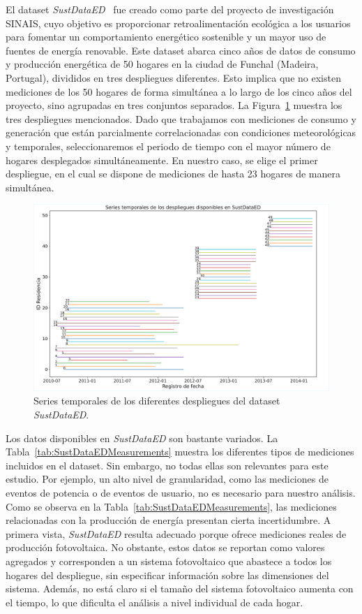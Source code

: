 El dataset \textit{SustDataED}~\cite{sustdata} fue creado como parte del proyecto de investigación SINAIS, cuyo objetivo es proporcionar retroalimentación ecológica a los usuarios para fomentar un comportamiento energético sostenible y un mayor uso de fuentes de energía renovable. Este dataset abarca cinco años de datos de consumo y producción energética de 50 hogares en la ciudad de Funchal (Madeira, Portugal), divididos en tres despliegues diferentes. Esto implica que no existen mediciones de los 50 hogares de forma simultánea a lo largo de los cinco años del proyecto, sino agrupadas en tres conjuntos separados. La Figura~\ref{fig:demographics} muestra los tres despliegues mencionados. Dado que trabajamos con mediciones de consumo y generación que están parcialmente correlacionadas con condiciones meteorológicas y temporales, seleccionaremos el periodo de tiempo con el mayor número de hogares desplegados simultáneamente. En nuestro caso, se elige el primer despliegue, en el cual se dispone de mediciones de hasta 23 hogares de manera simultánea.
 

\begin{figure}[ht!]
    \centering
    \includegraphics[width=\textwidth]{fig/06_fault_sg/fault_sg_01.pdf}
    \caption{Series temporales de los diferentes despliegues del dataset \textit{SustDataED}.}
    \label{fig:demographics}
\end{figure}

Los datos disponibles en \textit{SustDataED} son bastante variados. La Tabla~\ref{tab:SustDataEDMeasurements} muestra los diferentes tipos de mediciones incluidos en el dataset. Sin embargo, no todas ellas son relevantes para este estudio. Por ejemplo, un alto nivel de granularidad, como las mediciones de eventos de potencia o de eventos de usuario, no es necesario para nuestro análisis. Como se observa en la Tabla~\ref{tab:SustDataEDMeasurements}, las mediciones relacionadas con la producción de energía presentan cierta incertidumbre. A primera vista, \textit{SustDataED} resulta adecuado porque ofrece mediciones reales de producción fotovoltaica. No obstante, estos datos se reportan como valores agregados y corresponden a un sistema fotovoltaico que abastece a todos los hogares del despliegue, sin especificar información sobre las dimensiones del sistema. Además, no está claro si el tamaño del sistema fotovoltaico aumenta con el tiempo, lo que dificulta el análisis a nivel individual de cada hogar.


